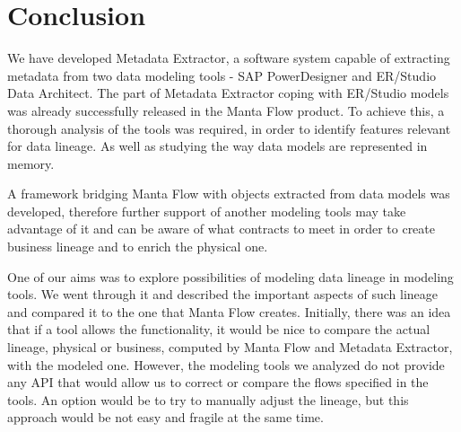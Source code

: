 \chapter*{Conclusion}
We have developed Metadata Extractor, a software system capable of extracting metadata from two data modeling tools - SAP PowerDesigner and ER/Studio Data Architect. 
The part of Metadata Extractor coping with ER/Studio models was already successfully released in the Manta Flow product.
To achieve this, a thorough analysis of the tools was required, in order to identify features relevant for data lineage. As well as studying the way data models are represented in memory.

A framework bridging Manta Flow with objects extracted from data models was developed, therefore further support of another modeling tools may take advantage of it and can be aware of what contracts to meet in order to create business lineage and to enrich the physical one.

One of our aims was to explore possibilities of modeling data lineage in modeling tools.
We went through it and described the important aspects of such lineage and compared it to the one that Manta Flow creates. 
Initially, there was an idea that if a tool allows the functionality, it would be nice to compare the actual lineage, physical or business, computed by Manta Flow and Metadata Extractor, with the modeled one. 
However, the modeling tools we analyzed do not provide any API that would allow us to correct or compare the flows specified in the tools. 
An option would be to try to manually adjust the lineage, but this approach would be not easy and fragile at the same time.

